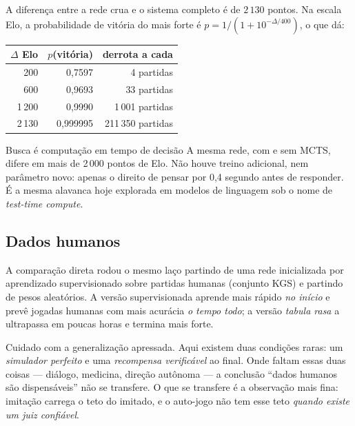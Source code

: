 \documentclass[11pt]{article}
\begin{document}
A diferença entre a rede crua e o sistema completo é de $2\,130$ pontos. Na escala
Elo, a probabilidade de vitória do mais forte é
$p = 1/(1 + 10^{-\Delta/400})$, o que dá:

\begin{center}
\begin{tabular}{rrr}
\toprule
$\Delta$ Elo & $p$(vitória) & derrota a cada \\
\midrule
  200 & 0,7597 & 4 partidas \\
  600 & 0,9693 & 33 partidas \\
1\,200 & 0,9990 & 1\,001 partidas \\
2\,130 & 0,999995 & 211\,350 partidas \\
\bottomrule
\end{tabular}
\end{center}

\begin{teobox}{Busca é computação em tempo de decisão}
A mesma rede, com e sem MCTS, difere em mais de 2\,000 pontos de Elo. Não houve
treino adicional, nem parâmetro novo: apenas o direito de pensar por 0,4 segundo
antes de responder. É a mesma alavanca hoje explorada em modelos de linguagem sob
o nome de \emph{test-time compute}.
\end{teobox}

\subsection{Dados humanos}

A comparação direta rodou o mesmo laço partindo de uma rede inicializada por
aprendizado supervisionado sobre partidas humanas (conjunto KGS) e partindo de
pesos aleatórios. A versão supervisionada aprende mais rápido \emph{no início} e
prevê jogadas humanas com mais acurácia \emph{o tempo todo}; a versão
\emph{tabula rasa} a ultrapassa em poucas horas e termina mais forte.

\begin{alertabox}
Cuidado com a generalização apressada. Aqui existem duas condições raras: um
\emph{simulador perfeito} e uma \emph{recompensa verificável} ao final. Onde
faltam essas duas coisas — diálogo, medicina, direção autônoma — a conclusão
``dados humanos são dispensáveis'' não se transfere. O que se transfere é a
observação mais fina: imitação carrega o teto do imitado, e o auto-jogo não tem
esse teto \emph{quando existe um juiz confiável}.
\end{alertabox}
\end{document}
